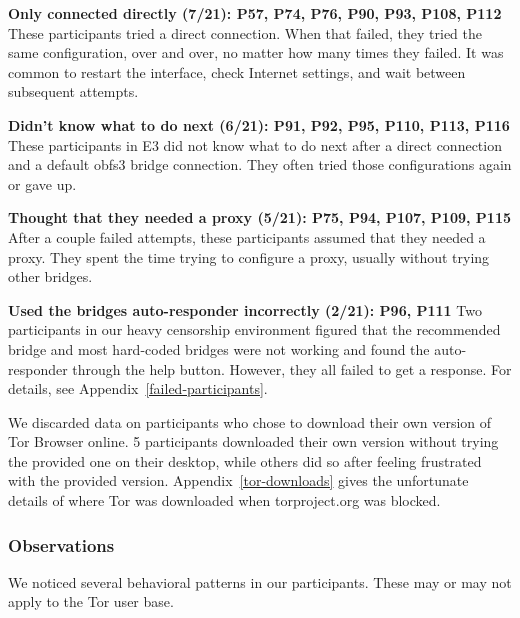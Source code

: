\documentclass[USenglish,oneside,twocolumn]{article}
\begin{document}
\begin{description}
\item {\bfseries Only connected directly (7/21): P57, P74, P76, P90, P93, P108, P112} These participants tried a direct connection. When that failed, they tried the same configuration, over and over, no matter how many times they failed. It was common to restart the interface, check Internet settings, and wait between subsequent attempts. 
\item {\bfseries Didn't know what to do next (6/21): P91, P92, P95, P110, P113, P116} These participants in E3 did not know what to do next after a direct connection and a default obfs3 bridge connection. They often tried those configurations again or gave up. 
\item {\bfseries Thought that they needed a proxy (5/21): P75, P94, P107, P109, P115} After a couple failed attempts, these participants assumed that they needed a proxy. They spent the time trying to configure a proxy, usually without trying other bridges. 
\item {\bfseries Used the bridges auto-responder incorrectly (2/21): P96, P111} Two participants in our heavy censorship environment figured that the recommended bridge and most hard-coded bridges were not working and found the auto-responder through the help button. However, they all failed to get a response. For details, see Appendix~\ref{failed-participants}.
\end{description} 

We discarded data on participants who chose to download their own version of Tor Browser online. 5 participants downloaded their own version without trying the provided one on their desktop, while others did so after feeling frustrated with the provided version. Appendix~\ref{tor-downloads} gives the unfortunate details of where Tor was downloaded when torproject.org was blocked.

\subsubsection{Observations}
We noticed several behavioral patterns in our participants. These may or may not apply to the Tor user base.\\
\end{document}
